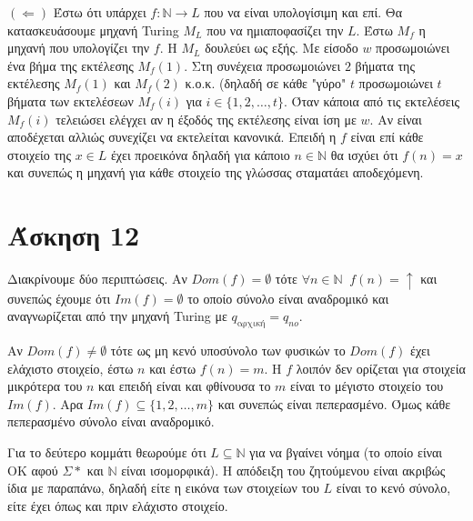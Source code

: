 \documentclass[11pt]{article}
\begin{document}
$(\Leftarrow)$ Έστω ότι υπάρχει $f:\mathbb{N}\rightarrow L$ που να είναι υπολογίσιμη και επί. Θα
κατασκευάσουμε μηχανή Turing $M_L$ που να ημιαποφασίζει την $L$. Έστω $M_f$ η μηχανή που υπολογίζει 
την $f$. H $M_L$ δουλεύει ως εξής. Με είσοδο $w$ προσωμοιώνει ένα βήμα της εκτέλεσης $M_f(1)$. Στη συνέχεια 
προσωμοιώνει $2$ βήματα της εκτέλεσης $M_f(1)$ και $M_f(2)$ κ.ο.κ. (δηλαδή σε κάθε "γύρο" $t$ προσωμοιώνει
$t$ βήματα των εκτελέσεων $M_f(i)$ για $i\in\{1,2,\ldots,t\}$. Όταν κάποια από τις εκτελέσεις $M_f(i)$ τελειώσει ελέγχει
αν η έξοδός της εκτέλεσης είναι ίση με $w$. Αν είναι αποδέχεται αλλιώς συνεχίζει να εκτελείται κανονικά.
Επειδή η $f$ είναι επί κάθε στοιχείο της $x\in L$ έχει προεικόνα δηλαδή για κάποιο $n\in \mathbb{N}$ θα ισχύει ότι
$f(n)=x$ και συνεπώς η μηχανή για κάθε στοιχείο της γλώσσας σταματάει αποδεχόμενη.




\section*{Άσκηση 12}
Διακρίνουμε δύο περιπτώσεις. Αν $Dom(f)=\emptyset$ τότε $\forall n\in \mathbb{N}\;\; f(n) = \uparrow$ και 
συνεπώς έχουμε ότι $Im(f)=\emptyset$ το οποίο σύνολο είναι αναδρομικό και αναγνωρίζεται από την 
μηχανή Turing με $q_{\text{αρχική}} = q_{no}$.

Αν $Dom(f)\neq\emptyset$ τότε ως μη κενό υποσύνολο των φυσικών το $Dom(f)$ έχει ελάχιστο στοιχείο, έστω $n$ 
και έστω $f(n) = m$. Η $f$ λοιπόν δεν ορίζεται για στοιχεία μικρότερα του $n$ και επειδή είναι και φθίνουσα
το $m$ είναι το μέγιστο στοιχείο του $Im(f)$. Αρα $Im(f) \subseteq \{1,2,\ldots,m\}$ και συνεπώς είναι 
πεπερασμένο. Όμως κάθε πεπερασμένο σύνολο είναι αναδρομικό.

Για το δεύτερο κομμάτι θεωρούμε ότι $L\subseteq\mathbb{N}$ για να βγαίνει νόημα (το οποίο είναι OK αφού  
$\Sigma*$ και $\mathbb{N}$ είναι ισομορφικά). Η απόδειξη του ζητούμενου είναι ακριβώς ίδια με παραπάνω, 
δηλαδή είτε η εικόνα των στοιχείων του $L$ είναι το κενό σύνολο, είτε έχει όπως και πριν ελάχιστο στοιχείο.

\end{document}
